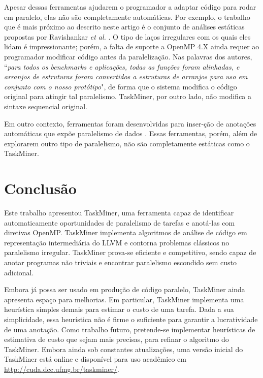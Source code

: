 \documentclass[sigconf]{acmart}
\newcommand\Taskminer{\mbox{\textsf{TaskMiner}}}
\begin{document}
Apesar dessas ferramentas ajudarem o programador a adaptar código para rodar em paralelo, elas não são completamente automáticas. Por exemplo, o trabalho que é mais próximo ao descrito neste artigo é o conjunto de análises estáticas propostas por Ravishankar {\em et al.} \cite{Ravishankar14}. O tipo de laços irregulares com os quais eles lidam é impressionante; porém, a falta de suporte a OpenMP 4.X ainda requer ao programador modificar código antes da paralelização. Nas palavras dos autores, ``{\em para todos os benchmarks e aplicações, todas as funções foram alinhadas, e arranjos de estruturas foram convertidos a estruturas de arranjos para uso em conjunto com o nosso protótipo}", de forma que o sistema modifica o código original para atingir tal paralelismo. \Taskminer{}, por outro lado, não modifica a sintaxe sequencial original.

Em outro contexto, ferramentas foram desenvolvidas para inser-ção de anotações automáticas que expõe paralelismo de dados \cite{Wang2009}. Essas ferramentas, porém, além de explorarem outro tipo de paralelismo, não são completamente estáticas como o \Taskminer{}.

\section{Conclus\~{a}o}
\label{sec:conc}

Este trabalho apresentou \Taskminer{}, uma ferramenta capaz de identificar automaticamente oportunidades de paralelismo de tarefas e anotá-las com diretivas OpenMP. \Taskminer{} implementa algoritmos de análise de código em representação intermediária do LLVM e contorna problemas clássicos no paralelismo irregular. \Taskminer{} prova-se eficiente e competitivo, sendo capaz de anotar programas não triviais e encontrar paralelismo escondido sem custo adicional. 

Embora já possa ser usado em produção de código paralelo, \Taskminer{} ainda apresenta espaço
para melhorias.
Em particular, \Taskminer{} implementa uma heurística simples demais para estimar o custo de uma tarefa.
Dada a sua simplicidade, essa heurística não é firme o suficiente para garantir a lucratividade de uma anotação. Como trabalho futuro, pretende-se implementar heurísticas de estimativa de custo que sejam mais precisas, para refinar o algoritmo do \Taskminer{}. Embora ainda sob constantes atualizações, uma versão inicial do
\Taskminer{} está online e disponível para uso acadêmico em \url{http://cuda.dcc.ufmg.br/taskminer/}.


\end{document}
